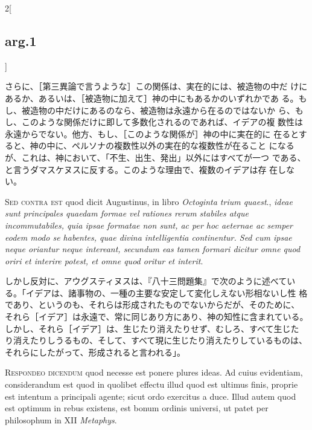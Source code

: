 \documentclass[paper=a4paper,fontsize=10pt,jafontsize=9pt,titlepage]{jlreq}
\begin{document}
\begin{paracol}{2}[\subsection{arg.1}]
\switchcolumn

さらに、［第三異論で言うような］この関係は、実在的には、被造物の中だ
けにあるか、あるいは、［被造物に加えて］神の中にもあるかのいずれかであ
る。もし、被造物の中だけにあるのなら、被造物は永遠から在るのではないか
ら、もし、このような関係だけに即して多数化されるのであれば、イデアの複
数性は永遠からでない。他方、もし、［このような関係が］神の中に実在的に
在るとすると、神の中に、ペルソナの複数性以外の実在的な複数性が在ること
になるが、これは、神において、「不生、出生、発出」以外にはすべてが一つ
である、と言うダマスケヌスに反する。このような理由で、複数のイデアは存
在しない。

\switchcolumn*[\subsection{s.c.}]

{\scshape Sed contra est} quod dicit Augustinus, in libro {\itshape
Octoginta trium quaest}., {\itshape ideae sunt principales quaedam
formae vel rationes rerum stabiles atque incommutabiles, quia ipsae
formatae non sunt, ac per hoc aeternae ac semper eodem modo se habentes,
quae divina intelligentia continentur. Sed cum ipsae neque oriantur
neque intereant, secundum eas tamen formari dicitur omne quod oriri et
interire potest, et omne quod oritur et interit}.

\switchcolumn

しかし反対に、アウグスティヌスは、『八十三問題集』で次のように述べてい
る。「イデアは、諸事物の、一種の主要な安定して変化しえない形相ないし性
格であり、というのも、それらは形成されたものでないからだが、そのために、
それら［イデア］は永遠で、常に同じあり方にあり、神の知性に含まれている。
しかし、それら［イデア］は、生じたり消えたりせず、むしろ、すべて生じた
り消えたりしうるもの、そして、すべて現に生じたり消えたりしているものは、
それらにしたがって、形成されると言われる」。


{\scshape Respondeo dicendum} quod necesse est ponere plures ideas. Ad
cuius evidentiam, considerandum est quod in quolibet effectu illud
quod est ultimus finis, proprie est intentum a principali agente;
sicut ordo exercitus a duce. Illud autem quod est optimum in rebus
existens, est bonum ordinis universi, ut patet per philosophum in XII
{\itshape Metaphys}.


\end{paracol}
\end{document}
